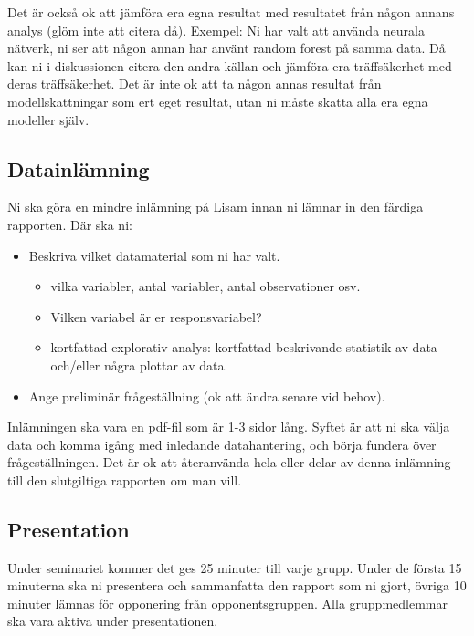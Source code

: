 \documentclass[a4paper]{article}
\begin{document}
Det är också ok att jämföra era egna resultat med resultatet från någon annans analys (glöm inte att citera då). Exempel: Ni har valt att använda neurala nätverk, ni ser att någon annan har använt random forest på samma data. Då kan ni i diskussionen citera den andra källan och jämföra era träffsäkerhet med deras träffsäkerhet. Det är inte ok att ta någon annas resultat från modellskattningar som ert eget resultat, utan ni måste skatta alla era egna modeller själv.

\subsection*{Datainlämning}
Ni ska göra en mindre inlämning på Lisam innan ni lämnar in den färdiga rapporten. Där ska ni:
\begin{itemize}
    \item Beskriva vilket datamaterial som ni har valt.
    \begin{itemize}
        \item vilka variabler, antal variabler, antal observationer osv.
        \item Vilken variabel är er responsvariabel? 
        \item kortfattad explorativ analys: kortfattad beskrivande statistik av data och/eller några plottar av data.
    \end{itemize}
    \item Ange preliminär frågeställning (ok att ändra senare vid behov).
\end{itemize}
Inlämningen ska vara en pdf-fil som är 1-3 sidor lång. Syftet är att ni ska välja data och komma igång med inledande datahantering, och börja fundera över frågeställningen. Det är ok att återanvända hela eller delar av denna inlämning till den slutgiltiga rapporten om man vill.

\subsection*{Presentation}
Under seminariet kommer det ges 25 minuter till varje grupp. Under de första 15 
minuterna ska ni presentera och sammanfatta den rapport som ni gjort, övriga 10 
minuter lämnas för opponering från opponentsgruppen. Alla gruppmedlemmar ska vara aktiva under presentationen.
\end{document}
